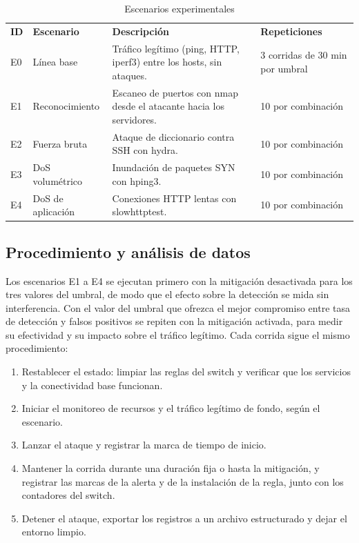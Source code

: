 \begin{table}[H]
\centering
\footnotesize
\renewcommand{\arraystretch}{1.2}
\caption{{\fontsize{11pt}{13}\selectfont Escenarios experimentales}}
\label{tbl:escenarios}
\begin{tabular}{@{}L{1.0cm}L{3.6cm}L{6.4cm}L{4.2cm}@{}}
\textbf{ID} & \textbf{Escenario} & \textbf{Descripción} & \textbf{Repeticiones} \\
E0 & Línea base & Tráfico legítimo (ping, HTTP, iperf3) entre los hosts, sin ataques. & 3 corridas de 30 min por umbral \\
E1 & Reconocimiento & Escaneo de puertos con nmap desde el atacante hacia los servidores. & 10 por combinación \\
E2 & Fuerza bruta & Ataque de diccionario contra SSH con hydra. & 10 por combinación \\
E3 & DoS volumétrico & Inundación de paquetes SYN con hping3. & 10 por combinación \\
E4 & DoS de aplicación & Conexiones HTTP lentas con slowhttptest. & 10 por combinación \\
\end{tabular}
\end{table}

\subsection{Procedimiento y análisis de datos}

Los escenarios E1 a E4 se ejecutan primero con la mitigación desactivada para los tres valores del umbral, de modo que el efecto sobre la detección se mida sin interferencia. Con el valor del umbral que ofrezca el mejor compromiso entre tasa de detección y falsos positivos se repiten con la mitigación activada, para medir su efectividad y su impacto sobre el tráfico legítimo. Cada corrida sigue el mismo procedimiento:
\begin{enumerate}
    \item Restablecer el estado: limpiar las reglas del switch y verificar que los servicios y la conectividad base funcionan.
    \item Iniciar el monitoreo de recursos y el tráfico legítimo de fondo, según el escenario.
    \item Lanzar el ataque y registrar la marca de tiempo de inicio.
    \item Mantener la corrida durante una duración fija o hasta la mitigación, y registrar las marcas de la alerta y de la instalación de la regla, junto con los contadores del switch.
    \item Detener el ataque, exportar los registros a un archivo estructurado y dejar el entorno limpio.
\end{enumerate}


